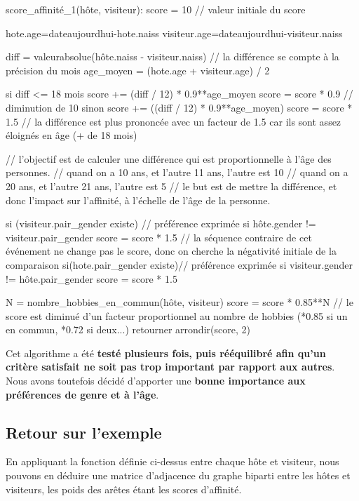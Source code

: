 \documentclass{mytex}
\begin{document}
\begin{codebox}
score_affinité_1(hôte, visiteur):
    score = 10
    // valeur initiale du score

    hote.age=dateaujourdhui-hote.naiss
    visiteur.age=dateaujourdhui-visiteur.naiss

    diff = valeurabsolue(hôte.naiss - visiteur.naiss) 
    // la différence se compte à la précision du mois
    age_moyen = (hote.age + visiteur.age) / 2

    si diff <= 18 mois
        score += (diff / 12) * 0.9**age_moyen
	score = score * 0.9 // diminution de 10%
    sinon 
        score += ((diff / 12) * 0.9**age_moyen) 
	score = score * 1.5 // la différence est plus prononcée avec un facteur de 1.5 car ils sont assez éloignés en âge (+ de 18 mois)

    // l'objectif est de calculer une différence qui est proportionnelle à l'âge des personnes.
    // quand on a 10 ans, et l'autre 11 ans, l'autre est 10%
    // quand on a 20 ans, et l'autre 21 ans, l'autre est 5%
    // le but est de mettre la différence, et donc l'impact sur l'affinité, à l'échelle de l'âge de la personne.

    si (visiteur.pair_gender existe) // préférence exprimée
	    si hôte.gender != visiteur.pair_gender
	        score = score * 1.5
    // la séquence contraire de cet événement ne change pas le score, donc on cherche la négativité initiale de la comparaison
    si(hote.pair_gender existe)// préférence exprimée
	    si visiteur.gender != hôte.pair_gender
	        score = score * 1.5

    N = nombre_hobbies_en_commun(hôte, visiteur)
        score = score * 0.85**N
    // le score est diminué d'un facteur proportionnel au nombre de hobbies (*0.85 si un en commun, *0.72 si deux...)
retourner arrondir(score, 2) 

\end{codebox}

Cet algorithme a été \textbf{ testé plusieurs fois, puis rééquilibré afin qu'un critère satisfait ne soit pas trop important par rapport aux autres}.
Nous avons toutefois décidé d'apporter une \textbf{bonne importance aux préférences de genre et à l'âge}.

\subsection{Retour sur l'exemple}

En appliquant la fonction définie ci-dessus entre chaque hôte et visiteur, nous pouvons en déduire une matrice d'adjacence du graphe biparti entre les hôtes et visiteurs, les poids des arêtes étant les scores d'affinité.
\end{document}
